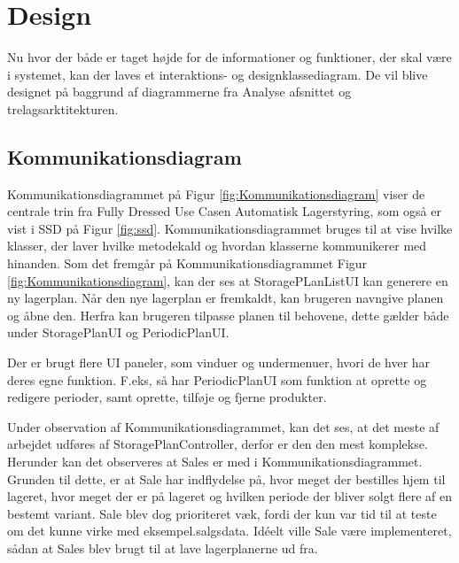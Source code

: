 \chapter{Design}\label{ch:design}
Nu hvor der både er taget højde for de informationer og funktioner, der skal være i systemet, kan der laves et interaktions- og designklassediagram. De vil blive designet på baggrund af diagrammerne fra Analyse afsnittet og trelagsarktitekturen. 

\section{Kommunikationsdiagram}
Kommunikationsdiagrammet \cite{Larman2004} på Figur \ref{fig:Kommunikationsdiagram} viser de centrale trin fra Fully Dressed Use Casen Automatisk Lagerstyring, som også er vist i SSD på Figur \ref{fig:ssd}. Kommunikationsdiagrammet bruges til at vise hvilke klasser, der laver hvilke metodekald og hvordan klasserne kommunikerer med hinanden. 
Som det fremgår på Kommunikationsdiagrammet Figur \ref{fig:Kommunikationsdiagram}, kan der ses at StoragePLanListUI kan generere en ny lagerplan. Når den nye lagerplan er fremkaldt, kan brugeren navngive planen og åbne den. Herfra kan brugeren tilpasse planen til behovene, dette gælder både under StoragePlanUI og PeriodicPlanUI. 

Der er brugt flere UI paneler, som vinduer og undermenuer, hvori de hver har deres egne funktion. 
F.eks, så har PeriodicPlanUI som funktion at oprette og redigere perioder, samt oprette, tilføje og fjerne produkter. 

Under observation af Kommunikationsdiagrammet, kan det ses, at det meste af arbejdet udføres af StoragePlanController, derfor er den den mest komplekse. Herunder kan det observeres at Sales er med i Kommunikationsdiagrammet. Grunden til dette, er at Sale har indflydelse på, hvor meget der bestilles hjem til lageret, hvor meget der er på lageret og hvilken periode der bliver solgt flere af en bestemt variant. 
Sale blev dog prioriteret væk, fordi der kun var tid til at teste om det kunne virke med eksempel.salgsdata.
Idéelt ville Sale være implementeret, sådan at Sales blev brugt til at lave lagerplanerne ud fra.

